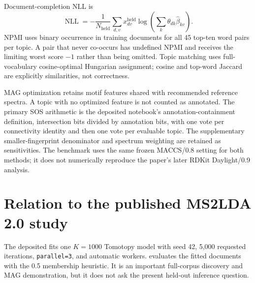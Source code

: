 \documentclass[11pt]{article}
\newcommand{\code}[1]{\texttt{#1}}
\begin{document}
Document-completion NLL is
\begin{equation}
 \operatorname{NLL}=-\frac{1}{N_{\mathrm{held}}}
 \sum_{d,v}x_{dv}^{\mathrm{held}}\log\left(
 \sum_k\widehat\theta_{dk}\widehat\beta_{kv}\right).
\end{equation}
NPMI uses binary occurrence in training documents for all 45 top-ten word
pairs per topic. A pair that never co-occurs has undefined NPMI and receives
the limiting worst score $-1$ rather than being omitted. Topic matching uses
full-vocabulary cosine-optimal Hungarian assignment; cosine and top-word
Jaccard are explicitly similarities, not correctness.

MAG optimization retains motif features shared with recommended reference
spectra. A topic with no optimized feature is not counted as annotated. The
primary SOS arithmetic is the deposited notebook's annotation-containment
definition, intersection bits divided by annotation bits, with one vote per
connectivity identity and then one vote per evaluable topic. The supplementary
smaller-fingerprint denominator and spectrum weighting are retained as
sensitivities. The benchmark uses the same frozen MACCS/0.8 setting for both
methods; it does not numerically reproduce the paper's later RDKit
Daylight/0.9 analysis.

\section{Relation to the published MS2LDA 2.0 study}
\label{app:nature}

The deposited  fits one $K=1000$ Tomotopy model
with seed 42, 5,000 requested iterations, \code{parallel=3}, and automatic
workers.  evaluates the fitted documents with the
0.5 membership heuristic. It is an important full-corpus discovery and MAG
demonstration, but it does not ask the present held-out inference question.
\end{document}
